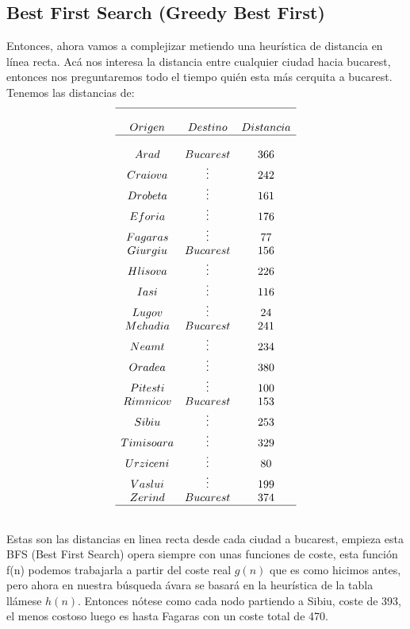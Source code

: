 \documentclass[tikz,11pt,fleqn]{book} %
\begin{document}
\subsection{Best First Search (Greedy Best First)}
Entonces, ahora vamos a complejizar metiendo una heurística de distancia en línea recta. Acá nos interesa la distancia entre cualquier ciudad hacia bucarest, entonces nos preguntaremos todo el tiempo quién esta más cerquita a bucarest. Tenemos las distancias de:
$$
\begin{array}{ccc}
    \hline  \\
    Origen & Destino & Distancia \\
    \hline  \\
    Arad & Bucarest & 366 \\
    Craiova & \vdots & 242 \\
    Drobeta & \vdots & 161 \\
    Eforia & \vdots & 176 \\
    Fagaras & \vdots & 77 \\
    Giurgiu & Bucarest & 156 \\
    Hlisova & \vdots & 226 \\
    Iasi & \vdots & 116 \\
    Lugov & \vdots & 24 \\ 
    Mehadia & Bucarest & 241 \\ 
    Neamt & \vdots & 234 \\ 
    Oradea & \vdots & 380 \\ 
    Pitesti & \vdots & 100 \\ 
    Rimnicov & Bucarest & 153 \\ 
    Sibiu & \vdots & 253 \\ 
    Timisoara & \vdots & 329 \\ 
    Urziceni & \vdots & 80 \\ 
    Vaslui & \vdots & 199 \\ 
    Zerind & Bucarest & 374 \\ 
    \hline  \\
\end{array}
$$

Estas son las distancias en linea recta desde cada ciudad a bucarest, empieza esta BFS (Best First Search) opera siempre con unas funciones de coste, esta función f(n) podemos trabajarla a partir del coste real $g(n)$ que es como hicimos antes, pero ahora en nuestra búsqueda ávara se basará en la heurística de la tabla llámese $h(n)$.
Entonces nótese como cada nodo partiendo a Sibiu, coste de 393, el menos costoso luego es hasta Fagaras con un coste total de 470.
\end{document}
